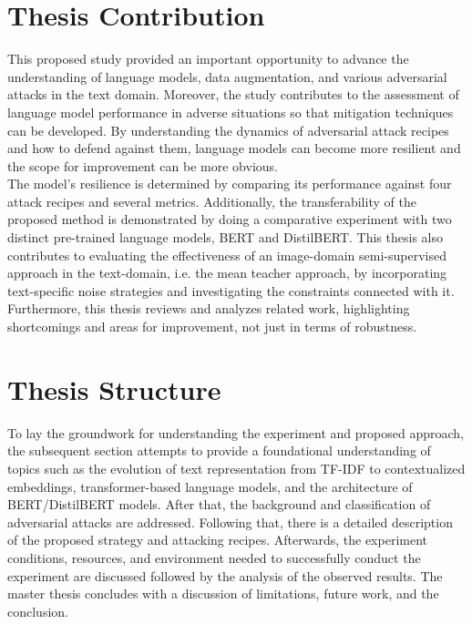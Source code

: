 \documentclass[%
	BCOR=8mm, %
	DIV=12,
	toc=bibliography, %
	toc=listof, %
	oneside, %
	egregdoesnotlikesansseriftitles, %
	]{scrbook}
\begin{document}
\section{Thesis Contribution}
This proposed study provided an important opportunity to advance the understanding of language models, data augmentation, and various adversarial attacks in the text domain. Moreover, the study contributes to the assessment of language model performance in adverse situations so that mitigation techniques can be developed. By understanding the dynamics of adversarial attack recipes and how to defend against them, language models can become more resilient and the scope for improvement can be more obvious. \\
The model's resilience is determined by comparing its performance against four attack recipes and several metrics. Additionally, the transferability of the proposed method is demonstrated by doing a comparative experiment with two distinct pre-trained language models, BERT and DistilBERT. This thesis also contributes to evaluating the effectiveness of an image-domain semi-supervised approach in the text-domain, i.e. the mean teacher approach, by incorporating text-specific noise strategies and investigating the constraints connected with it. Furthermore, this thesis reviews and analyzes related work, highlighting shortcomings and areas for improvement, not just in terms of robustness.
\section{Thesis Structure}
To lay the groundwork for understanding the experiment and proposed approach, the subsequent section attempts to provide a foundational understanding of topics such as the evolution of text representation from TF-IDF to contextualized embeddings, transformer-based language models, and the architecture of BERT/DistilBERT models. After that, the background and classification of adversarial attacks are addressed. Following that, there is a detailed description of the proposed strategy and attacking recipes. Afterwards, the experiment conditions, resources, and environment needed to successfully conduct the experiment are discussed followed by the analysis of the observed results. The master thesis concludes with a discussion of limitations, future work, and the conclusion.
\end{document}
